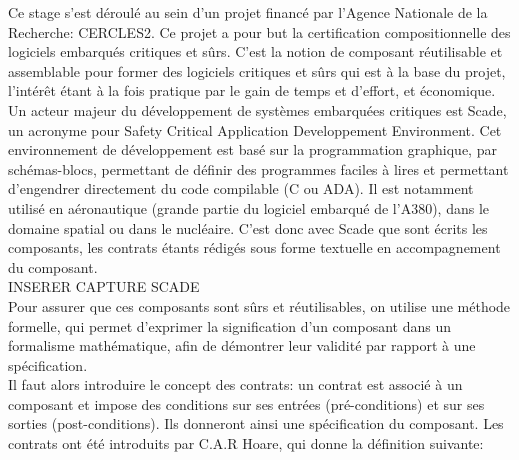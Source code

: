 


Ce stage s'est déroulé au sein d'un projet financé par l'Agence
Nationale de la Recherche: CERCLES2. Ce projet a pour but la
certification compositionnelle des logiciels embarqués critiques et
sûrs. C'est la notion de composant réutilisable et assemblable pour former des
logiciels critiques et sûrs qui est à la base du projet, l'intérêt étant à la fois
pratique par le gain de temps et d'effort, et économique. \\

Un acteur majeur du développement de systèmes embarquées critiques est Scade,
un acronyme pour Safety Critical Application Developpement Environment. Cet
environnement de développement est basé sur la programmation graphique, par
schémas-blocs, permettant de définir des programmes faciles à lires et
permettant d'engendrer directement du code compilable (C ou ADA). Il est
notamment utilisé en aéronautique (grande partie du logiciel embarqué de
l'A380), dans le domaine spatial ou dans le nucléaire. C'est donc avec Scade
que sont écrits les composants, les contrats étants rédigés sous forme
textuelle en accompagnement du composant.\\

INSERER CAPTURE SCADE\\

Pour assurer que ces composants sont sûrs et réutilisables, on
utilise une méthode formelle, qui permet d'exprimer la signification d'un
composant dans un formalisme mathématique, afin de démontrer leur
validité par rapport à une spécification.\\
Il faut alors introduire le concept des contrats: un contrat est
associé à un composant et impose des conditions sur ses entrées
(pré-conditions) et sur ses sorties (post-conditions). Ils donneront
ainsi une spécification du composant. Les contrats
ont été introduits par C.A.R Hoare, qui donne la définition
suivante:\\

\noindent
{}\\

